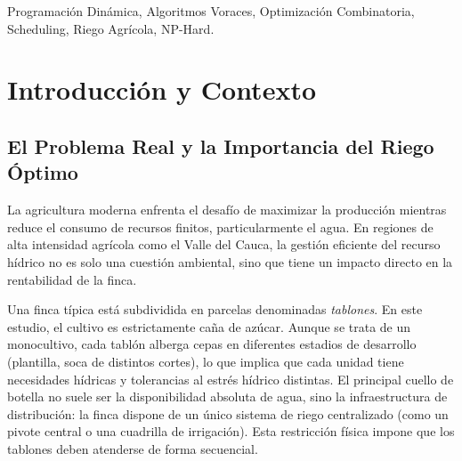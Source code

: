 \documentclass[conference, a4paper]{IEEEtran}
\begin{document}
\begin{abstract}
Este trabajo compara tres estrategias para calcular el orden de riego que minimice las pérdidas por estrés hídrico en una finca cañera: Fuerza Bruta, un algoritmo Voraz con lookahead predictivo y Programación Dinámica con memoización. Mostramos que el problema pertenece a la clase NP-Hard, lo que hace inviable la Fuerza Bruta para instancias grandes. La Programación Dinámica reduce la complejidad de $O(n!)$ a $O(n \cdot 2^n)$ y produce resultados exactos hasta $n \approx 18$, mientras el Voraz escala sin problemas hasta $n=25$ con errores menores al 3\%. Los tres algoritmos se validaron contra 19 casos de prueba con salidas esperadas conocidas. También se discute cómo integrar este motor algorítmico en una arquitectura web real con frontend en React/Angular, backend en Node.js y lógica de optimización en Python.
\end{abstract}

\renewcommand{\IEEEkeywordsname}{Palabras clave}
\begin{IEEEkeywords}
Programación Dinámica, Algoritmos Voraces, Optimización Combinatoria, Scheduling, Riego Agrícola, NP-Hard.
\end{IEEEkeywords}

\section{Introducción y Contexto}
\subsection{El Problema Real y la Importancia del Riego Óptimo}
La agricultura moderna enfrenta el desafío de maximizar la producción mientras reduce el consumo de recursos finitos, particularmente el agua. En regiones de alta intensidad agrícola como el Valle del Cauca, la gestión eficiente del recurso hídrico no es solo una cuestión ambiental, sino que tiene un impacto directo en la rentabilidad de la finca.

Una finca típica está subdividida en parcelas denominadas \textit{tablones}. En este estudio, el cultivo es estrictamente caña de azúcar. Aunque se trata de un monocultivo, cada tablón alberga cepas en diferentes estadios de desarrollo (plantilla, soca de distintos cortes), lo que implica que cada unidad tiene necesidades hídricas y tolerancias al estrés hídrico distintas. El principal cuello de botella no suele ser la disponibilidad absoluta de agua, sino la infraestructura de distribución: la finca dispone de un único sistema de riego centralizado (como un pivote central o una cuadrilla de irrigación). Esta restricción física impone que los tablones deben atenderse de forma secuencial.
\end{document}
